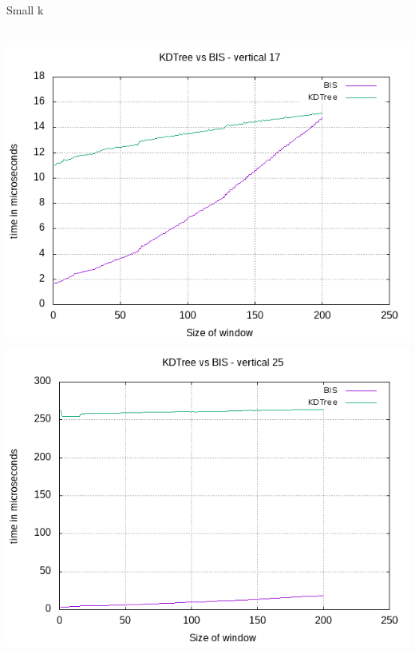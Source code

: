 \documentclass[pdf]{beamer}
\begin{document}
\begin{frame}{Small k}
  \begin{columns}
    \includegraphics[scale=0.35]{pictures/analysis/smalls/vert_17.png}
    \includegraphics[scale=0.35]{pictures/analysis/smalls/vert_25.png}
  \end{columns}
\end{frame}
\end{document}
